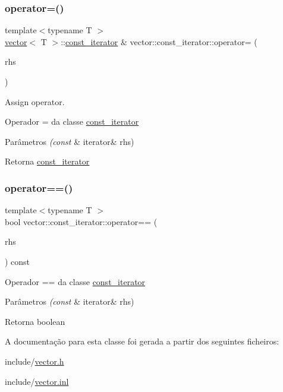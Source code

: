 \subsubsection{\texorpdfstring{operator=()}{operator=()}}
{\footnotesize\ttfamily template$<$typename T $>$ \\
\mbox{\hyperlink{classsc_1_1vector}{vector}}$<$ T $>$\+::\mbox{\hyperlink{classsc_1_1vector_1_1const__iterator}{const\+\_\+iterator}} \& vector\+::const\+\_\+iterator\+::operator= (\begin{DoxyParamCaption}\item[{const \mbox{\hyperlink{classsc_1_1vector_1_1const__iterator}{const\+\_\+iterator}} \&}]{rhs }\end{DoxyParamCaption})}



Assign operator. 

Operador = da classe \mbox{\hyperlink{classsc_1_1vector_1_1const__iterator}{const\+\_\+iterator}} 
\begin{DoxyParams}{Parâmetros}
{\em (const} & iterator\& rhs) \\
\hline
\end{DoxyParams}
\begin{DoxyReturn}{Retorna}
\mbox{\hyperlink{classsc_1_1vector_1_1const__iterator}{const\+\_\+iterator}} 
\end{DoxyReturn}
\mbox{\label{classsc_1_1vector_1_1const__iterator_a3f7bd553bd903e94df8942c1809f0e8e}} 
\subsubsection{\texorpdfstring{operator==()}{operator==()}}
{\footnotesize\ttfamily template$<$typename T $>$ \\
bool vector\+::const\+\_\+iterator\+::operator== (\begin{DoxyParamCaption}\item[{const \mbox{\hyperlink{classsc_1_1vector_1_1const__iterator}{const\+\_\+iterator}} \&}]{rhs }\end{DoxyParamCaption}) const}

Operador == da classe \mbox{\hyperlink{classsc_1_1vector_1_1const__iterator}{const\+\_\+iterator}} 
\begin{DoxyParams}{Parâmetros}
{\em (const} & iterator\& rhs) \\
\hline
\end{DoxyParams}
\begin{DoxyReturn}{Retorna}
boolean 
\end{DoxyReturn}


A documentação para esta classe foi gerada a partir dos seguintes ficheiros\+:\begin{DoxyCompactItemize}
\item 
include/\mbox{\hyperlink{vector_8h}{vector.\+h}}\item 
include/\mbox{\hyperlink{vector_8inl}{vector.\+inl}}\end{DoxyCompactItemize}
